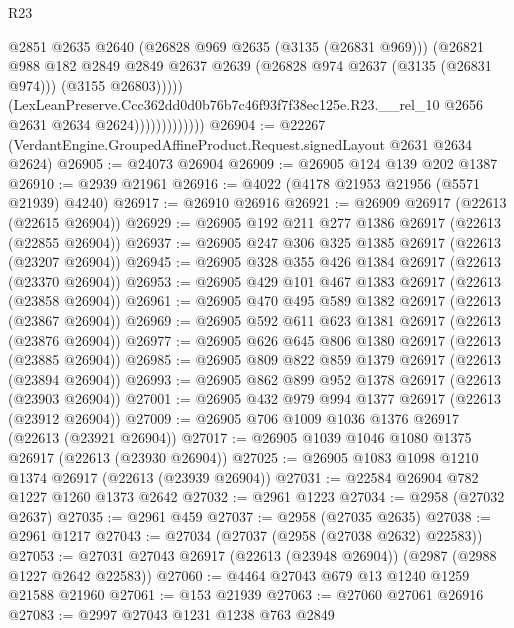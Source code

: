 \begin{lexlean}{R23}
\begin{coremodule}
                                  @2851
                                  @2635
                                  @2640
                                  (@26828 @969 @2635 (@3135 (@26831 @969)))
                                  (@26821
                                    @988
                                    @182
                                    @2849
                                    @2849
                                    @2637
                                    @2639
                                    (@26828 @974 @2637 (@3135 (@26831 @974)))
                                    (@3155 @26803)))))
                            (LexLeanPreserve.Ccc362dd0d0b76b7c46f93f7f38ec125e.R23.__rel_10
                              @2656
                              @2631
                              @2634
                              @2624)))))))))))))
@26904 := @22267 (VerdantEngine.GroupedAffineProduct.Request.signedLayout @2631 @2634 @2624)
@26905 := @24073 @26904
@26909 := @26905 @124 @139 @202 @1387
@26910 := @2939 @21961
@26916 := @4022 (@4178 @21953 @21956 (@5571 @21939) @4240)
@26917 := @26910 @26916
@26921 := @26909 @26917 (@22613 (@22615 @26904))
@26929 := @26905 @192 @211 @277 @1386 @26917 (@22613 (@22855 @26904))
@26937 := @26905 @247 @306 @325 @1385 @26917 (@22613 (@23207 @26904))
@26945 := @26905 @328 @355 @426 @1384 @26917 (@22613 (@23370 @26904))
@26953 := @26905 @429 @101 @467 @1383 @26917 (@22613 (@23858 @26904))
@26961 := @26905 @470 @495 @589 @1382 @26917 (@22613 (@23867 @26904))
@26969 := @26905 @592 @611 @623 @1381 @26917 (@22613 (@23876 @26904))
@26977 := @26905 @626 @645 @806 @1380 @26917 (@22613 (@23885 @26904))
@26985 := @26905 @809 @822 @859 @1379 @26917 (@22613 (@23894 @26904))
@26993 := @26905 @862 @899 @952 @1378 @26917 (@22613 (@23903 @26904))
@27001 := @26905 @432 @979 @994 @1377 @26917 (@22613 (@23912 @26904))
@27009 := @26905 @706 @1009 @1036 @1376 @26917 (@22613 (@23921 @26904))
@27017 := @26905 @1039 @1046 @1080 @1375 @26917 (@22613 (@23930 @26904))
@27025 := @26905 @1083 @1098 @1210 @1374 @26917 (@22613 (@23939 @26904))
@27031 := @22584 @26904 @782 @1227 @1260 @1373 @2642
@27032 := @2961 @1223
@27034 := @2958 (@27032 @2637)
@27035 := @2961 @459
@27037 := @2958 (@27035 @2635)
@27038 := @2961 @1217
@27043 := @27034 (@27037 (@2958 (@27038 @2632) @22583))
@27053 := @27031 @27043 @26917 (@22613 (@23948 @26904)) (@2987 (@2988 @1227 @2642 @22583))
@27060 := @4464 @27043 @679 @13 @1240 @1259 @21588 @21960
@27061 := @153 @21939
@27063 := @27060 @27061 @26916
@27083 := @2997
    @27043
    @1231
    @1238
    @763
    @2849

\end{coremodule}
\end{lexlean}
